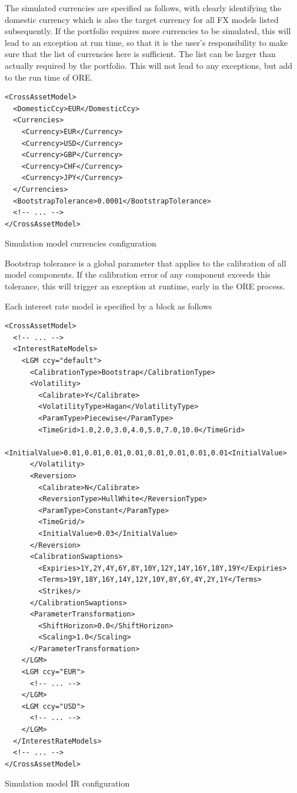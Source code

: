 \documentclass[12pt, a4paper]{article}
\begin{document}
\medskip The simulated currencies are specified as follows, with clearly identifying the domestic currency which is also
the target currency for all FX models listed subsequently. If the portfolio requires more currencies to be simulated,
this will lead to an exception at run time, so that it is the user's responsibility to make sure that the list of
currencies here is sufficient. The list can be larger than actually required by the portfolio. This will not lead to any
exceptions, but add to the run time of ORE.

\begin{listing}[H]
\begin{verbatim}
<CrossAssetModel>
  <DomesticCcy>EUR</DomesticCcy>
  <Currencies>
    <Currency>EUR</Currency>
    <Currency>USD</Currency>
    <Currency>GBP</Currency>
    <Currency>CHF</Currency>
    <Currency>JPY</Currency>
  </Currencies>
  <BootstrapTolerance>0.0001</BootstrapTolerance>
  <!-- ... -->
</CrossAssetModel>
\end{verbatim}
\caption{Simulation model currencies configuration}
\label{lst:simulation_model_currencies_configuration}
\end{listing}
 
Bootstrap tolerance is a global parameter that applies to the calibration of all model components. If the calibration
error of any component exceeds this tolerance, this will trigger an exception at runtime, early in the ORE process.

\medskip

Each interest rate model is specified by a block as follows

\begin{listing}[H]
\begin{verbatim}
<CrossAssetModel>	
  <!-- ... -->
  <InterestRateModels>
    <LGM ccy="default">
      <CalibrationType>Bootstrap</CalibrationType>
      <Volatility>
        <Calibrate>Y</Calibrate>
        <VolatilityType>Hagan</VolatilityType>
        <ParamType>Piecewise</ParamType>
        <TimeGrid>1.0,2.0,3.0,4.0,5.0,7.0,10.0</TimeGrid>
        <InitialValue>0.01,0.01,0.01,0.01,0.01,0.01,0.01,0.01<InitialValue>
      </Volatility>
      <Reversion>
        <Calibrate>N</Calibrate>
        <ReversionType>HullWhite</ReversionType>
        <ParamType>Constant</ParamType>
        <TimeGrid/>
        <InitialValue>0.03</InitialValue>
      </Reversion>
      <CalibrationSwaptions>
        <Expiries>1Y,2Y,4Y,6Y,8Y,10Y,12Y,14Y,16Y,18Y,19Y</Expiries>
        <Terms>19Y,18Y,16Y,14Y,12Y,10Y,8Y,6Y,4Y,2Y,1Y</Terms>
        <Strikes/>
      </CalibrationSwaptions>
      <ParameterTransformation>
        <ShiftHorizon>0.0</ShiftHorizon>
        <Scaling>1.0</Scaling>
      </ParameterTransformation>
    </LGM>
    <LGM ccy="EUR">
      <!-- ... -->
    </LGM>
    <LGM ccy="USD">
      <!-- ... -->
    </LGM>
  </InterestRateModels>	
  <!-- ... -->		
</CrossAssetModel>
\end{verbatim}
\caption{Simulation model IR configuration}
\label{lst:simulation_model_ir_configuration}
\end{listing}
\end{document}
